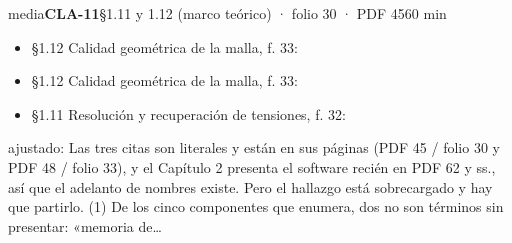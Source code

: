 \begin{ficha}{media}{\casilla\textbf{CLA-11}\quad{}\quad §1.11 y 1.12 (marco teórico) · folio 30 · PDF 45\hfill 60 min}
\begin{itemize}[leftmargin=1.2em,itemsep=1pt,topsep=1pt]
\item {\small §1.12 Calidad geométrica de la malla, f. 33: }
\item {\small §1.12 Calidad geométrica de la malla, f. 33: }
\item {\small §1.11 Resolución y recuperación de tensiones, f. 32: }
\end{itemize}
{\footnotesize\color{gris}ajustado: Las tres citas son literales y están en sus páginas (PDF 45 /\allowbreak{} folio 30 y PDF 48 /\allowbreak{} folio 33), y el Capítulo 2 presenta el software recién en PDF 62 y ss., así que el adelanto de nombres existe. Pero el hallazgo está sobrecargado y hay que partirlo. (1) De los cinco componentes que enumera, dos no son términos sin presentar: «memoria de…\par}
\end{ficha}
